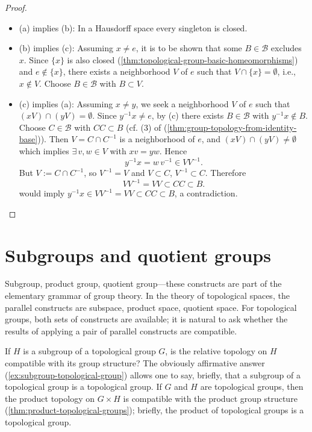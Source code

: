 \begin{proof}~
    \begin{itemize}
        \item (a) implies (b): In a Hausdorff space every singleton is closed.
        \item (b) implies (c): Assuming \( x \neq e \), it is to be shown that some \( B \in \mathscr{B} \) excludes \( x \).
              Since \( \{x\} \) is also closed (\ref{thm:topological-group-basic-homeomorphisms}) and \( e \notin \{x\} \), there exists a neighborhood \( V \) of \( e \) such that \( V \cap \{x\} = \emptyset \), i.e., \( x \notin V \).
              Choose \( B \in \mathscr{B} \) with \( B \subset V \).
        \item (c) implies (a): Assuming \( x \neq y \), we seek a neighborhood \( V \) of \( e \) such that \( (xV) \cap (yV) = \emptyset \).
              Since \( y^{-1}x \neq e \), by (c) there exists \( B \in \mathscr{B} \) with \( y^{-1}x \notin B \).
              Choose \( C \in \mathscr{B} \) with \( CC \subset B \) (cf. (3) of (\ref{thm:group-topology-from-identity-base})).
              Then \( V = C \cap C^{-1} \) is a neighborhood of \( e \), and \( (xV) \cap (yV) \neq \emptyset \)
              which implies  $\exists\,v,w\in V$ with $xv=yw$. Hence
              \[
                  y^{-1}x =  w\,v^{-1}\in V V^{-1}.
              \]
              But $V:=C\cap C^{-1}$, so $V^{-1}=V$ and $V\subset C$, $V^{-1}\subset C$. Therefore
              \[
                  VV^{-1}=VV \subset CC \subset B.
              \]
              would imply \( y^{-1}x \in VV^{-1} = VV \subset CC \subset B \),  a contradiction.
    \end{itemize}
\end{proof}


\section{Subgroups and quotient groups}

Subgroup, product group, quotient group—these constructs are part of the elementary grammar of group theory. In the theory of topological spaces, the parallel constructs are subspace, product space, quotient space. For topological groups, both sets of constructs are available; it is natural to ask whether the results of applying a pair of parallel constructs are compatible.

If \( H \) is a subgroup of a topological group \( G \), is the relative topology on \( H \) compatible with its group structure? The obviously affirmative answer (\ref{ex:subgroup-topological-group}) allows one to say, briefly, that a subgroup of a topological group is a topological group. If \( G \) and \( H \) are topological groups, then the product topology on \( G \times H \) is compatible with the product group structure (\ref{thm:product-topological-groups}); briefly, the product of topological groups is a topological group.


